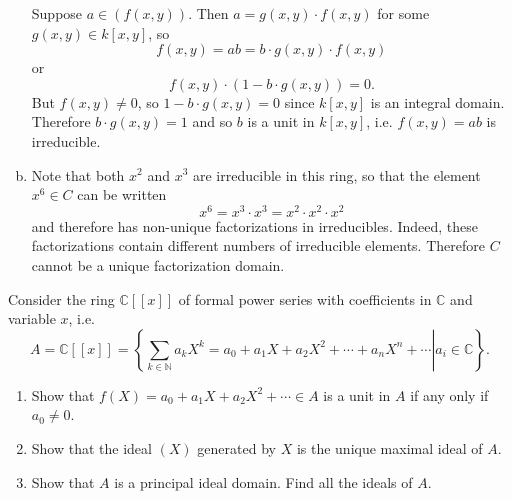 \documentclass{article}
\newcounter{Problem}
\newenvironment{Problem}{\begin{Exercise}[name={Problem},
                                          counter={Problem}]}
                        {\end{Exercise}}
\begin{document}
\begin{Answer}
\begin{enumerate}[(a)]
{\begin{itemize}
{          Suppose $a \in (f(x,y))$. Then
          $a = g(x,y) \cdot f(x,y)$ for some $g(x,y) \in k[x, y]$, so
          $$
          f(x, y) = ab = b \cdot g(x,y) \cdot f(x,y)
          $$
          or
          $$
          f(x, y) \cdot (1 - b \cdot g(x,y)) = 0.
          $$
          But
          $f(x, y) \neq 0$, so $1 - b \cdot g(x,y) = 0$ since $k[x, y]$
          is an integral domain. Therefore $b \cdot g(x,y) = 1$ and so $b$ is a
          unit in $k[x,y]$, i.e. $f(x,y) = ab$ is irreducible.
        }
      \end{itemize}
    }
    \item{
      Note that both $x^2$ and $x^3$ are irreducible in this ring, so
      that the element $x^6 \in C$ can be written
      $$
      x^6 = x^3 \cdot x^3 = x^2 \cdot x^2 \cdot x^2
      $$
      and therefore has non-unique factorizations in
      irreducibles. Indeed, these factorizations contain different
      numbers of irreducible elements. Therefore $C$ cannot be a unique factorization
      domain.
    }
  \end{enumerate}
\end{Answer}

\pagebreak

\begin{Problem}
  Consider the ring $\mathbb{C}[[x]]$ of formal power series with
  coefficients in $\mathbb{C}$ and variable $x$, i.e.
  $$
  A = \mathbb{C}[[x]] =
  \left\{
    \left.
      \sum_{k \in \mathbb{N}} a_k X^k
    = a_0 + a_1 X + a_2 X^2 + \cdots + a_n X^n + \cdots
    \right|
      a_i \in \mathbb{C}
  \right\}.
  $$
  \begin{enumerate}
    \item{
      Show that $f(X) = a_0 + a_1 X + a_2 X^2 + \cdots \in A$ is a
      unit in $A$ if any only if $a_0 \neq 0$.
    }
    \item{
      Show that the ideal $(X)$ generated by $X$ is the unique maximal
      ideal of $A$.
    }
    \item{
      Show that $A$ is a principal ideal domain. Find all the ideals
      of $A$.
    }
  \end{enumerate}
\end{Problem}
\end{document}
